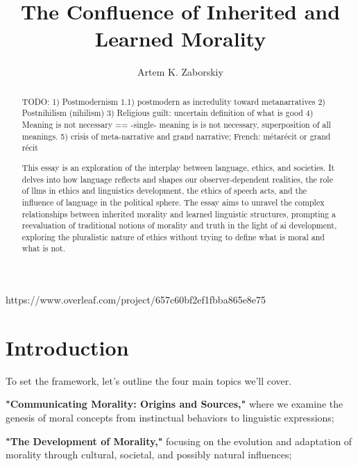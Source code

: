 \documentclass[11pt,a4]{article}
\begin{document}
\title{The Confluence of Inherited and Learned Morality}

\author{Artem K. Zaborskiy }


\maketitle

https://www.overleaf.com/project/657c60bf2ef1fbba865e8e75

\begin{abstract}

TODO:
1) Postmodernism
1.1) postmodern as incredulity toward metanarratives
2) Postnihilism (nihilism)
3) Religious guilt: uncertain definition of what is good
4) Meaning is not necessary == -single- meaning is is not necessary, superposition of all meanings.
5) crisis of meta-narrative and grand narrative; French: métarécit or grand récit


This essay is an exploration of the interplay between language, ethics, and societies. It delves into how language reflects and shapes our observer-dependent realities, the role of \ac{llms} in ethics and linguistics development, the ethics of speech acts, and the influence of language in the political sphere. The essay aims to unravel the complex relationships between inherited morality and learned linguistic structures, prompting a reevaluation of traditional notions of morality and truth in the light of \ac{ai} development, exploring the pluralistic nature of ethics without trying to define what is moral and what is not.
\end{abstract}

\tableofcontents
\printacronyms




\section{Introduction}

To set the framework, let's outline the four main topics we'll cover.

\textbf{"Communicating Morality: Origins and Sources,"} where we examine the genesis of moral concepts from instinctual behaviors to linguistic expressions;

\textbf{"The Development of Morality,"} focusing on the evolution and adaptation of morality through cultural, societal, and possibly natural influences;
\end{document}
